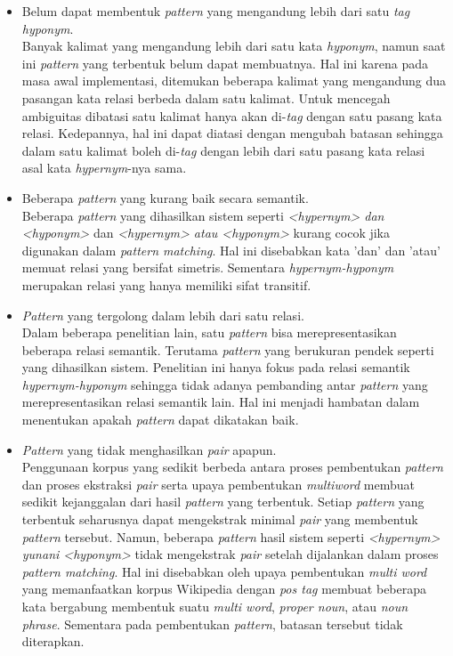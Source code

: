 \begin{itemize}
  \item Belum dapat membentuk \textit{pattern} yang mengandung lebih dari satu \textit{tag hyponym}. \\
  Banyak kalimat yang mengandung lebih dari satu kata \textit{hyponym}, namun saat ini \textit{pattern} yang terbentuk belum dapat membuatnya. Hal ini karena pada masa awal implementasi, ditemukan beberapa kalimat yang mengandung dua pasangan kata relasi berbeda dalam satu kalimat. Untuk mencegah ambiguitas dibatasi satu kalimat hanya akan di-\textit{tag} dengan satu pasang kata relasi. Kedepannya, hal ini dapat diatasi dengan mengubah batasan sehingga dalam satu kalimat boleh di-\textit{tag} dengan lebih dari satu pasang kata relasi asal kata \textit{hypernym}-nya sama. 
  \item Beberapa \textit{pattern} yang kurang baik secara semantik. \\
  Beberapa \textit{pattern} yang dihasilkan sistem seperti \textit{<hypernym> dan <hyponym>} dan  \textit{<hypernym> atau <hyponym>} kurang cocok jika digunakan dalam \textit{pattern matching}. Hal ini disebabkan kata 'dan' dan 'atau' memuat relasi yang bersifat simetris. Sementara \textit{hypernym-hyponym} merupakan relasi yang hanya memiliki sifat transitif.
  \item \textit{Pattern} yang tergolong dalam lebih dari satu relasi. \\
  Dalam beberapa penelitian lain, satu \textit{pattern} bisa merepresentasikan beberapa relasi semantik. Terutama \textit{pattern} yang berukuran pendek seperti yang dihasilkan sistem. Penelitian ini hanya fokus pada relasi semantik \textit{hypernym-hyponym} sehingga tidak adanya pembanding antar \textit{pattern} yang merepresentasikan relasi semantik lain. Hal ini menjadi hambatan dalam menentukan apakah \textit{pattern} dapat dikatakan baik.
  \item \textit{Pattern} yang tidak menghasilkan \textit{pair} apapun. \\
  Penggunaan korpus yang sedikit berbeda antara proses pembentukan \textit{pattern} dan proses ekstraksi \textit{pair} serta upaya pembentukan \textit{multiword} membuat sedikit kejanggalan dari hasil \textit{pattern} yang terbentuk. Setiap \textit{pattern} yang terbentuk seharusnya dapat mengekstrak minimal \textit{pair} yang membentuk \textit{pattern} tersebut. Namun, beberapa \textit{pattern} hasil sistem seperti \textit{<hypernym> yunani <hyponym>} tidak mengekstrak \textit{pair} setelah dijalankan dalam proses \textit{pattern matching}. Hal ini disebabkan oleh upaya pembentukan \textit{multi word} yang memanfaatkan korpus Wikipedia dengan \textit{pos tag} membuat beberapa kata bergabung membentuk suatu \textit{multi word}, \textit{proper noun}, atau \textit{noun phrase}. Sementara pada pembentukan \textit{pattern}, batasan tersebut tidak diterapkan.
\end{itemize}

